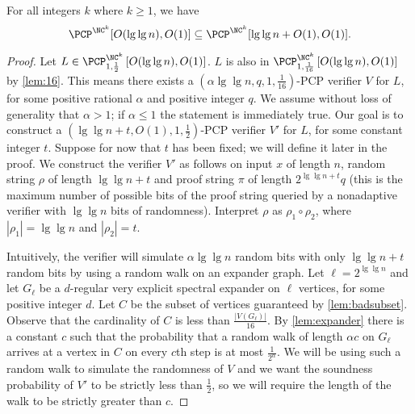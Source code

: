 \documentclass[]{article}
\newcommand{\PCPcs}[5]{\PCP^{#1}_{#2, #3}\left[#4, #5\right]}
\begin{document}
\begin{lemma}[{\cite[Lemma~4]{fs96}}]\label{lem:derandomize}
  For all integers $k$ where $k \geq 1$, we have
  \begin{equation*}
    \PCP^{\NC^k}[O(\lg \lg n), O(1)]
    \subseteq
    \PCP^{\NC^k}[\lg \lg n + O(1), O(1)].
  \end{equation*}
\end{lemma}
\begin{proof}
  Let $L \in \PCPcs{\NC^k}{1}{\frac{1}{2}}{O(\lg \lg n)}{O(1)}$.
  $L$ is also in $\PCPcs{\NC^k}{1}{\frac{1}{16}}{O(\lg \lg n)}{O(1)}$ by \autoref{lem:16}.
  This means there exists a $(\alpha \lg \lg n, q, 1, \frac{1}{16})$-PCP verifier $V$ for $L$, for some positive rational $\alpha$ and positive integer $q$.
  We assume without loss of generality that $\alpha > 1$; if $\alpha \leq 1$ the statement is immediately true.
  Our goal is to construct a $(\lg \lg n + t, O(1), 1, \frac{1}{2})$-PCP verifier $V'$ for $L$, for some constant integer $t$.
  Suppose for now that $t$ has been fixed; we will define it later in the proof.
  We construct the verifier $V'$ as follows on input $x$ of length $n$, random string $\rho$ of length $\lg \lg n + t$ and proof string $\pi$ of length $2^{\lg \lg n + t} q$ (this is the maximum number of possible bits of the proof string queried by a nonadaptive verifier with $\lg \lg n$ bits of randomness).
  Interpret $\rho$ as $\rho_1 \circ \rho_2$, where $|\rho_1| = \lg \lg n$ and $|\rho_2| = t$.

  Intuitively, the verifier will simulate $\alpha \lg \lg n$ random bits with only $\lg \lg n + t$ random bits by using a random walk on an expander graph.
  Let $\ell = 2^{\lg \lg n}$ and let $G_\ell$ be a $d$-regular very explicit spectral expander on $\ell$ vertices, for some positive integer $d$.
  Let $C$ be the subset of vertices guaranteed by \autoref{lem:badsubset}.
  Observe that the cardinality of $C$ is less than $\frac{|V(G_\ell)|}{16}$.
  By \autoref{lem:expander} there is a constant $c$ such that the probability that a random walk of length $\alpha c$ on $G_\ell$ arrives at a vertex in $C$ on every $c$th step is at most $\frac{1}{2^\alpha}$.
  We will be using such a random walk to simulate the randomness of $V$ and we want the soundness probability of $V'$ to be strictly less than $\frac{1}{2}$, so we will require the length of the walk to be strictly greater than $c$.


\end{proof}
\end{document}
